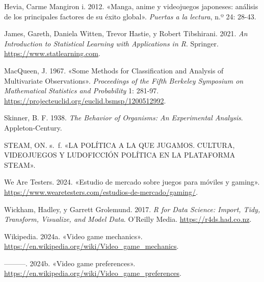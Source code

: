 \documentclass[
  letterpaper,
  DIV=11,
  numbers=noendperiod]{scrreprt}
\newlength{\cslhangindent}
\newlength{\cslentryspacingunit} %
\newenvironment{CSLReferences}[2] %
 {%
  \setlength{\parindent}{0pt}
  \ifodd #1
  \let\oldpar\par
  \def\par{\hangindent=\cslhangindent\oldpar}
  \fi
  \setlength{\parskip}{#2\cslentryspacingunit}
 }%
 {}
\begin{document}
\begin{CSLReferences}{1}{0}
\leavevmode{}%
Hevia, Carme Mangiron i. 2012. {«Manga, anime y videojuegos japoneses:
análisis de los principales factores de su éxito global»}. \emph{Puertas
a la lectura}, n.º 24: 28-43.

\leavevmode{}%
James, Gareth, Daniela Witten, Trevor Hastie, y Robert Tibshirani. 2021.
\emph{An Introduction to Statistical Learning with Applications in R}.
Springer. \url{https://www.statlearning.com}.

\leavevmode{}%
MacQueen, J. 1967. {«Some Methods for Classification and Analysis of
Multivariate Observations»}. \emph{Proceedings of the Fifth Berkeley
Symposium on Mathematical Statistics and Probability} 1: 281-97.
\url{https://projecteuclid.org/euclid.bsmsp/1200512992}.

\leavevmode{}%
Skinner, B. F. 1938. \emph{The Behavior of Organisms: An Experimental
Analysis}. Appleton-Century.

\leavevmode{}%
STEAM, ON. s.~f. {«LA POLÍTICA A LA QUE JUGAMOS. CULTURA, VIDEOJUEGOS Y
LUDOFICCIÓN POLÍTICA EN LA PLATAFORMA STEAM»}.

\leavevmode{}%
We Are Testers. 2024. {«Estudio de mercado sobre juegos para móviles y
gaming»}.
\url{https://www.wearetesters.com/estudios-de-mercado/gaming/}.

\leavevmode{}%
Wickham, Hadley, y Garrett Grolemund. 2017. \emph{R for Data Science:
Import, Tidy, Transform, Visualize, and Model Data}. O'Reilly Media.
\url{https://r4ds.had.co.nz}.

\leavevmode{}%
Wikipedia. 2024a. {«Video game mechanics»}.
\url{https://en.wikipedia.org/wiki/Video_game_mechanics}.

\leavevmode{}%
---------. 2024b. {«Video game preferences»}.
\url{https://en.wikipedia.org/wiki/Video_game_preferences}.

\end{CSLReferences}
\end{document}
